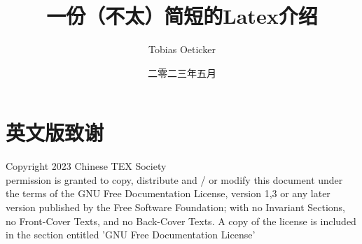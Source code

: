 \documentclass[12pt, a4paper, oneside]{ctexart}
\title{一份（不太）简短的Latex介绍}
\author{Tobias Oeticker}
\date{二零二三年五月}
\begin{document}
\maketitle

\section{英文版致谢}
	\noindent
		Copyright 2023 Chinese TEX Society\\
		permission is granted to copy, distribute and / or modify this document under the terms of the GNU Free Documentation License, version 1,3 or any later version published by the Free Software Foundation; with no Invariant Sections, no  Front-Cover Texts, and no Back-Cover Texts. A copy of the license is included in the section entitled 'GNU Free Documentation License' 
\end{document}
